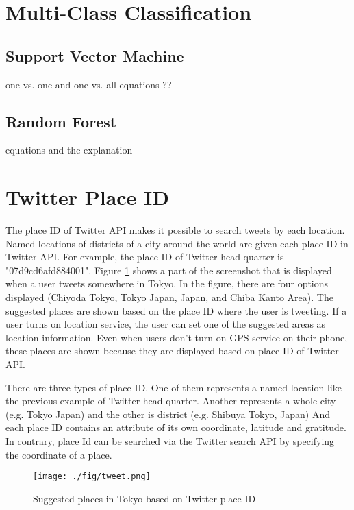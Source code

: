 \section{Multi-Class Classification}\label{sec:multi_class_clf} 
\subsection{Support Vector Machine}
one vs. one and one vs. all
equations ??
\subsection{Random Forest}
equations and the explanation

\section{Twitter Place ID}\label{sec:placeid}
The place ID of Twitter API \cite{twitter_api_placeid} makes it possible to search tweets by each location. 
Named locations of districts of a city around the world are given each place ID in Twitter API.
For example, the place ID of Twitter head quarter is "07d9cd6afd884001".
Figure \ref{fig:tweet} shows a part of the screenshot that is displayed when a user tweets somewhere in Tokyo.
In the figure, there are four options displayed (Chiyoda Tokyo, Tokyo Japan, Japan, and Chiba Kanto Area).
The suggested places are shown based on the place ID where the user is tweeting.
If a user turns on location service, the user can set one of the suggested areas as location information. 
Even when users don't turn on GPS service on their phone, these places are shown because they are displayed based on place ID of Twitter API.

There are three types of place ID.
One of them represents a named location like the previous example of Twitter head quarter.
Another represents a whole city (e.g. Tokyo Japan) and the other is district (e.g. Shibuya Tokyo, Japan)
And each place ID contains an attribute of its own coordinate, latitude and gratitude.
In contrary, place Id can be searched via the Twitter search API by specifying the coordinate of a place.


\begin{figure}
	\centering
	\texttt{[image: ./fig/tweet.png]}
	\caption{Suggested places in Tokyo based on Twitter place ID}
	\label{fig:tweet}
\end{figure}

